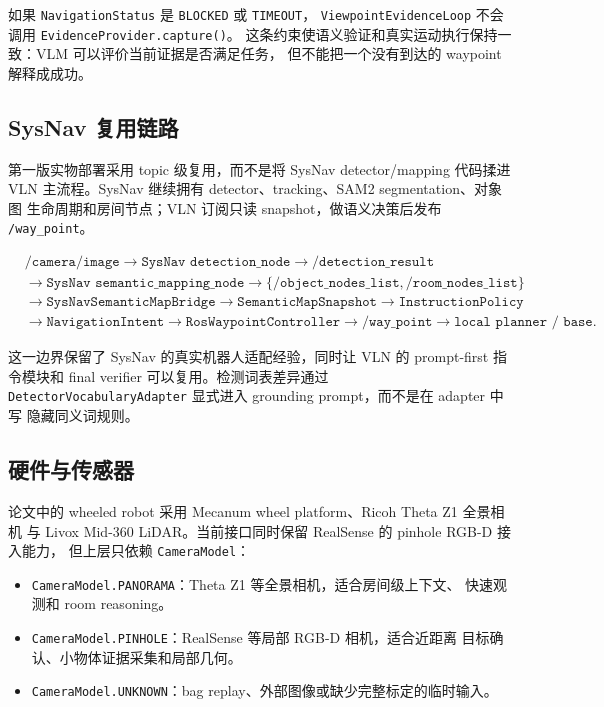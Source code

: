 \documentclass[UTF8,zihao=-4]{ctexart}
\begin{document}
如果 \texttt{NavigationStatus} 是 \texttt{BLOCKED} 或 \texttt{TIMEOUT}，
\texttt{ViewpointEvidenceLoop} 不会调用 \texttt{EvidenceProvider.capture()}。
这条约束使语义验证和真实运动执行保持一致：VLM 可以评价当前证据是否满足任务，
但不能把一个没有到达的 waypoint 解释成成功。

\subsection{SysNav 复用链路}

第一版实物部署采用 topic 级复用，而不是将 SysNav detector/mapping 代码揉进
VLN 主流程。SysNav 继续拥有 detector、tracking、SAM2 segmentation、对象图
生命周期和房间节点；VLN 订阅只读 snapshot，做语义决策后发布 \texttt{/way\_point}。

\begin{equation}
\begin{aligned}
&\texttt{/camera/image}
\rightarrow \texttt{SysNav detection\_node}
\rightarrow \texttt{/detection\_result} \\
&\rightarrow \texttt{SysNav semantic\_mapping\_node}
\rightarrow \{\texttt{/object\_nodes\_list},\texttt{/room\_nodes\_list}\} \\
&\rightarrow \texttt{SysNavSemanticMapBridge}
\rightarrow \texttt{SemanticMapSnapshot}
\rightarrow \texttt{InstructionPolicy} \\
&\rightarrow \texttt{NavigationIntent}
\rightarrow \texttt{RosWaypointController}
\rightarrow \texttt{/way\_point}
\rightarrow \texttt{local planner / base}.
\end{aligned}
\end{equation}

这一边界保留了 SysNav 的真实机器人适配经验，同时让 VLN 的 prompt-first
指令模块和 final verifier 可以复用。检测词表差异通过
\texttt{DetectorVocabularyAdapter} 显式进入 grounding prompt，而不是在 adapter 中写
隐藏同义词规则。

\subsection{硬件与传感器}

论文中的 wheeled robot 采用 Mecanum wheel platform、Ricoh Theta Z1 全景相机
与 Livox Mid-360 LiDAR。当前接口同时保留 RealSense 的 pinhole RGB-D 接入能力，
但上层只依赖 \texttt{CameraModel}：

\begin{itemize}[leftmargin=1.5em]
  \item \texttt{CameraModel.PANORAMA}：Theta Z1 等全景相机，适合房间级上下文、
  快速观测和 room reasoning。
  \item \texttt{CameraModel.PINHOLE}：RealSense 等局部 RGB-D 相机，适合近距离
  目标确认、小物体证据采集和局部几何。
  \item \texttt{CameraModel.UNKNOWN}：bag replay、外部图像或缺少完整标定的临时输入。
\end{itemize}
\end{document}
